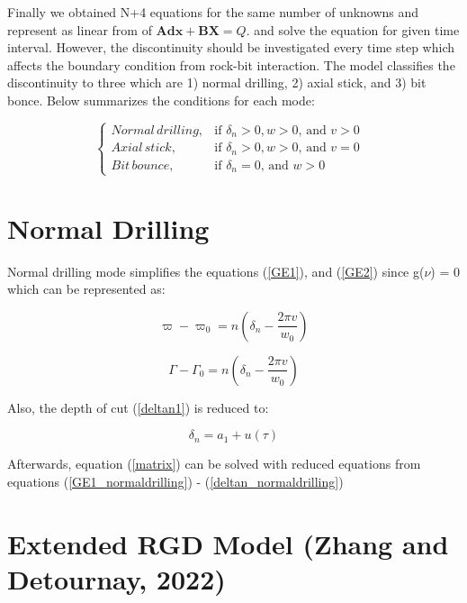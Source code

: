 Finally we obtained N+4 equations for the same number of unknowns and represent as linear from of $\bm{Adx} + \bm{BX} = Q$. and solve the equation for given time interval. However, the discontinuity should be investigated every time step which affects the boundary condition from rock-bit interaction. The model classifies the discontinuity to three which are 1) normal drilling, 2) axial stick, and 3) bit bonce. Below summarizes the conditions for each mode:

\begin{equation}\label{drillingmodes}
  \begin{cases}
    Normal\,drilling, & \mbox{if $\delta_n > 0, w > 0$, and $v > 0$ }  \\
    Axial\, stick, & \mbox{if $\delta_n >0, w > 0$, and $v = 0$ } \\
    Bit\,bounce, & \mbox{if $\delta_n = 0$, and $w > 0$}
  \end{cases}
\end{equation}

\section{Normal Drilling}
Normal drilling mode simplifies the equations (\ref{GE1}), and (\ref{GE2}) since g($\nu$) = 0 which can be represented as:

\begin{equation}\label{GE1_normaldrilling}
  \varpi-\varpi_0 = n\left(\delta_n - \frac{2\pi v}{w_0}\right)
\end{equation}

\begin{equation}\label{GE2_normaldrilling}
  \Gamma-\Gamma_0 = n\left(\delta_n - \frac{2\pi v}{w_0}\right)
\end{equation}

Also, the depth of cut (\ref{deltan1}) is reduced to:

\begin{equation}\label{deltan_normaldrilling}
  \delta_n = a_1 + u(\tau)
\end{equation}

Afterwards, equation (\ref{matrix}) can be solved with reduced equations from equations (\ref{GE1_normaldrilling}) - (\ref{deltan_normaldrilling})

\newpage
\section{Extended RGD Model (Zhang and Detournay, 2022)}



